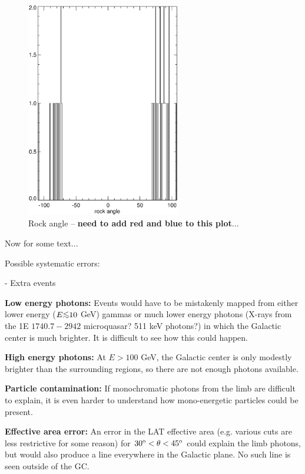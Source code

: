 \documentclass[aps,twocolumn,prd,superscriptaddress,showpacs,nofootinbib,fixfloat]{revtex4}
\newcommand{\degree}{^{\rm o}}
\def\la{\vcenter{\hbox{$<$}\offinterlineskip\hbox{$\sim$}}}
\begin{document}
\begin{figure}[p]
\centering
\includegraphics[width=0.6\textwidth]{plots/rockangle.ps}
\caption{Rock angle -- \textbf{need to add red and blue to this plot}...
}
\label{fig:rock}
\end{figure}

\clearpage
Now for some text...


Possible systematic errors:

- Extra events

{\bf Low energy photons:} Events would have to be mistakenly mapped from
either lower energy ($E \la 10$ GeV) gammas or much lower energy photons
(X-rays from the 1E $1740.7-2942$ microquasar?  511 keV photons?) in which the
Galactic center is much brighter.  It is difficult to see how this could
happen.

{\bf High energy photons:} At $E > 100$ GeV, the Galactic center is only
modestly brighter than the surrounding regions, so there are not enough
photons available.

{\bf Particle contamination:} If monochromatic photons from the limb are
difficult to explain, it is even harder to understand how mono-energetic
particles could be present. 

{\bf Effective area error:} An error in the LAT effective area (e.g. various
cuts are less restrictive for some reason) for $30\degree < \theta <
45\degree$ could explain the limb photons, but would also produce a line
everywhere in the Galactic plane.  No such line is seen outside of the GC. 
\end{document}
